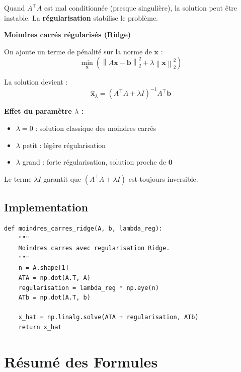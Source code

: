 \documentclass[12pt,a4paper]{article}
\newcommand{\norm}[1]{\left\| #1 \right\|}
\newcommand{\T}{^\top}
\begin{document}
Quand $A\T A$ est mal conditionnée (presque singulière), la solution peut être instable. La \textbf{régularisation} stabilise le problème.

\begin{theorembox}
\textbf{Moindres carrés régularisés (Ridge)}

On ajoute un terme de pénalité sur la norme de $\mathbf{x}$ :
\begin{equation}
\min_{\mathbf{x}} \left( \norm{A\mathbf{x} - \mathbf{b}}_2^2 + \lambda \norm{\mathbf{x}}_2^2 \right)
\end{equation}

La solution devient :
\begin{equation}
\boxed{\hat{\mathbf{x}}_\lambda = (A\T A + \lambda I)^{-1} A\T \mathbf{b}}
\end{equation}
\end{theorembox}

\textbf{Effet du paramètre $\lambda$ :}
\begin{itemize}
    \item $\lambda = 0$ : solution classique des moindres carrés
    \item $\lambda$ petit : légère régularisation
    \item $\lambda$ grand : forte régularisation, solution proche de $\mathbf{0}$
\end{itemize}

Le terme $\lambda I$ garantit que $(A\T A + \lambda I)$ est toujours inversible.

\subsection{Implementation}

\begin{lstlisting}
def moindres_carres_ridge(A, b, lambda_reg):
    """
    Moindres carres avec regularisation Ridge.
    """
    n = A.shape[1]
    ATA = np.dot(A.T, A)
    regularisation = lambda_reg * np.eye(n)
    ATb = np.dot(A.T, b)

    x_hat = np.linalg.solve(ATA + regularisation, ATb)
    return x_hat
\end{lstlisting}

\newpage
\section{Résumé des Formules}
\end{document}
